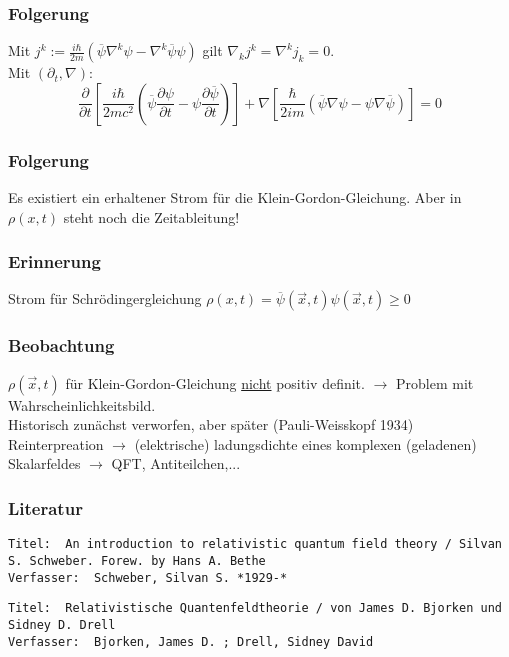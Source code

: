 \documentclass[twoside,a4paper]{scrartcl}
\renewcommand{\1}{\mathds{1}}
\newcommand{\ra}{\rightarrow}
\begin{document}
\subsubsection*{Folgerung}
Mit $j^k:=\frac{i\hbar}{2m}(\overline{\psi}\nabla^k\psi-\nabla^k \overline{\psi} \psi)$ gilt $\nabla_k j^k=\nabla^kj_k=0$.\\
Mit $(\partial_t,\nabla)$:
$$\frac{\partial}{\partial t}[\frac{i\hbar}{2mc^2}(\overline{\psi}\frac{\partial \psi}{\partial t}-\psi \frac{\partial \overline{\psi}}{\partial t})]+\nabla[\frac{\hbar}{2im}(\overline{\psi}\nabla \psi-\psi\nabla \overline{\psi})]=0$$
\subsubsection*{Folgerung}
Es existiert ein erhaltener Strom für die Klein-Gordon-Gleichung. Aber in $\rho(x,t)$ steht noch die Zeitableitung!
\subsubsection*{Erinnerung}
Strom für Schrödingergleichung $\rho(x,t)=\overline{\psi}(\vec x,t) \psi(\vec x,t)\geq 0$
\subsubsection*{Beobachtung}
$\rho(\vec x,t)$ für Klein-Gordon-Gleichung \underline{nicht} positiv definit. $\ra$ Problem mit Wahrscheinlichkeitsbild.\\
Historisch zunächst verworfen, aber später (Pauli-Weisskopf 1934) Reinterpreation $\ra$ (elektrische) ladungsdichte eines komplexen (geladenen) Skalarfeldes $\ra$ QFT, Antiteilchen,...
\subsubsection*{Literatur}
\begin{tiny}
\begin{verbatim}
Titel: 	An introduction to relativistic quantum field theory / Silvan S. Schweber. Forew. by Hans A. Bethe
Verfasser: 	Schweber, Silvan S. *1929-*
\end{verbatim}
\end{tiny}


\begin{tiny}
\begin{verbatim}
Titel: 	Relativistische Quantenfeldtheorie / von James D. Bjorken und Sidney D. Drell
Verfasser: 	Bjorken, James D. ; Drell, Sidney David
\end{verbatim}
\end{tiny}
\end{document}

